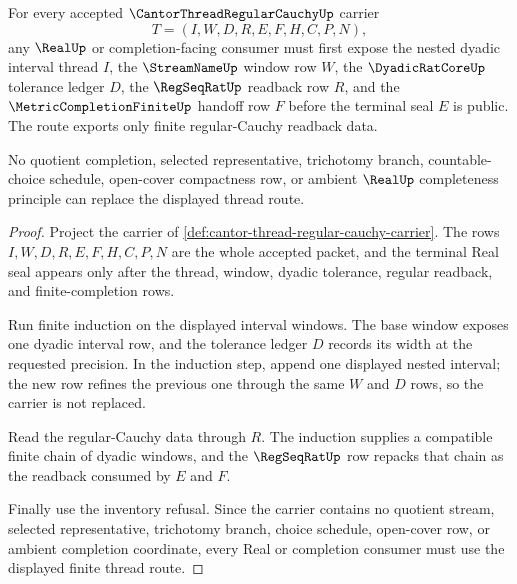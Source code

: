 \begin{theorem}
\label{thm:cantor-thread-regular-cauchy-real-seal}
For every accepted $\CantorThreadRegularCauchyUp$ carrier
$$
T=(I,W,D,R,E,F,H,C,P,N),
$$
any $\RealUp$ or completion-facing consumer must first expose the nested dyadic interval thread $I$, the $\StreamNameUp$ window row $W$, the $\DyadicRatCoreUp$ tolerance ledger $D$, the $\RegSeqRatUp$ readback row $R$, and the $\MetricCompletionFiniteUp$ handoff row $F$ before the terminal seal $E$ is public. The route exports only finite regular-Cauchy readback data.

No quotient completion, selected representative, trichotomy branch, countable-choice schedule, open-cover compactness row, or ambient $\RealUp$ completeness principle can replace the displayed thread route.
\end{theorem}
\begin{proof}
Project the carrier of \autoref{def:cantor-thread-regular-cauchy-carrier}. The rows $I,W,D,R,E,F,H,C,P,N$ are the whole accepted packet, and the terminal Real seal appears only after the thread, window, dyadic tolerance, regular readback, and finite-completion rows.

Run finite induction on the displayed interval windows. The base window exposes one dyadic interval row, and the tolerance ledger $D$ records its width at the requested precision. In the induction step, append one displayed nested interval; the new row refines the previous one through the same $W$ and $D$ rows, so the carrier is not replaced.

Read the regular-Cauchy data through $R$. The induction supplies a compatible finite chain of dyadic windows, and the $\RegSeqRatUp$ row repacks that chain as the readback consumed by $E$ and $F$.

Finally use the inventory refusal. Since the carrier contains no quotient stream, selected representative, trichotomy branch, choice schedule, open-cover row, or ambient completion coordinate, every Real or completion consumer must use the displayed finite thread route.
\end{proof}



